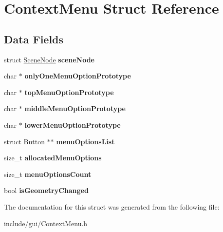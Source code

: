 \hypertarget{struct_context_menu}{}\section{Context\+Menu Struct Reference}
\label{struct_context_menu}
\subsection*{Data Fields}
\begin{DoxyCompactItemize}
\item 
\hypertarget{struct_context_menu_aca8025f56fb4ce20b974ec9a3292a9e4}{}\label{struct_context_menu_aca8025f56fb4ce20b974ec9a3292a9e4} 
struct \hyperlink{struct_scene_node}{Scene\+Node} {\bfseries scene\+Node}
\item 
\hypertarget{struct_context_menu_aa6389251f1af7286c5aaa578e346c5dd}{}\label{struct_context_menu_aa6389251f1af7286c5aaa578e346c5dd} 
char $\ast$ {\bfseries only\+One\+Menu\+Option\+Prototype}
\item 
\hypertarget{struct_context_menu_a489cbefce04ee974ad3a4e58b0a0d081}{}\label{struct_context_menu_a489cbefce04ee974ad3a4e58b0a0d081} 
char $\ast$ {\bfseries top\+Menu\+Option\+Prototype}
\item 
\hypertarget{struct_context_menu_a0a8ee24ce84177029e35240a5d6fbac0}{}\label{struct_context_menu_a0a8ee24ce84177029e35240a5d6fbac0} 
char $\ast$ {\bfseries middle\+Menu\+Option\+Prototype}
\item 
\hypertarget{struct_context_menu_a87a9f87725ed2420c45d02d2eb15a77b}{}\label{struct_context_menu_a87a9f87725ed2420c45d02d2eb15a77b} 
char $\ast$ {\bfseries lower\+Menu\+Option\+Prototype}
\item 
\hypertarget{struct_context_menu_ab97fe0e08e073e863f4fd62197738747}{}\label{struct_context_menu_ab97fe0e08e073e863f4fd62197738747} 
struct \hyperlink{struct_button}{Button} $\ast$$\ast$ {\bfseries menu\+Options\+List}
\item 
\hypertarget{struct_context_menu_a1bae963e7309ae68621dd9a07f7d31d6}{}\label{struct_context_menu_a1bae963e7309ae68621dd9a07f7d31d6} 
size\+\_\+t {\bfseries allocated\+Menu\+Options}
\item 
\hypertarget{struct_context_menu_a3cf8669d42fec7e69b5d299de9c30b5a}{}\label{struct_context_menu_a3cf8669d42fec7e69b5d299de9c30b5a} 
size\+\_\+t {\bfseries menu\+Options\+Count}
\item 
\hypertarget{struct_context_menu_a8ea7e8ac3e3330830aa7a4309390f3ac}{}\label{struct_context_menu_a8ea7e8ac3e3330830aa7a4309390f3ac} 
bool {\bfseries is\+Geometry\+Changed}
\end{DoxyCompactItemize}


The documentation for this struct was generated from the following file\+:\begin{DoxyCompactItemize}
\item 
include/gui/Context\+Menu.\+h\end{DoxyCompactItemize}
